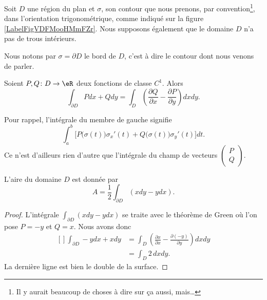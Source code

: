 Soit $D$ une région du plan et $\sigma$, son contour que nous prenons, par convention\footnote{Il y aurait beaucoup de choses à dire sur ça aussi, mais\ldots}, dans l'orientation trigonométrique, comme indiqué sur la figure \ref{LabelFigVDFMooHMmFZr}. Nous supposons également que le domaine $D$ n'a pas de trous intérieurs.
\newcommand{\CaptionFigVDFMooHMmFZr}{Un contour avec son ortientation.}


Nous notons par $\sigma=\partial D$ le bord de $D$, c'est à dire le contour dont nous venons de parler.

\begin{theorem}
    Soient $P,Q\colon D\to \eR$ deux fonctions de classe $C^1$. Alors
    \begin{equation}        \label{EqThoGreen}
        \int_{\partial D} Pdx+Qdy=\int_D\left( \frac{ \partial Q }{ \partial x }-\frac{ \partial P }{ \partial y } \right)dxdy.
    \end{equation}
\end{theorem}
Pour rappel, l'intégrale du membre de gauche signifie
\begin{equation}
    \int_a^b \Big[P\big( \sigma(t) \big)\sigma_x'(t)+Q\big( \sigma(t) \big)\sigma_y'(t)\Big]dt.
\end{equation}
Ce n'est d'ailleurs rien d'autre que l'intégrale du champ de vecteurs $\begin{pmatrix}
    P    \\ 
    Q    
\end{pmatrix}$.

\begin{corollary}
    L'aire du domaine $D$ est donnée par
    \begin{equation}
        A=\frac{ 1 }{2}\int_{\partial D}(xdy-ydx).
    \end{equation}
\end{corollary}

\begin{proof}
    L'intégrale $\int_{\partial D}(xdy-ydx)$ se traite avec le théorème de Green où l'on pose $P=-y$ et $Q=x$. Nous avons donc
    \begin{equation}
        \begin{aligned}[]
            \int_{\partial D} -ydx+xdy&=\int_D\left( \frac{ \partial x }{ \partial x }-\frac{ \partial (-y) }{ \partial y } \right)dxdy\\
            &=\int_D2\,dxdy.
        \end{aligned}
    \end{equation}
    La dernière ligne est bien le double de la surface.
\end{proof}

